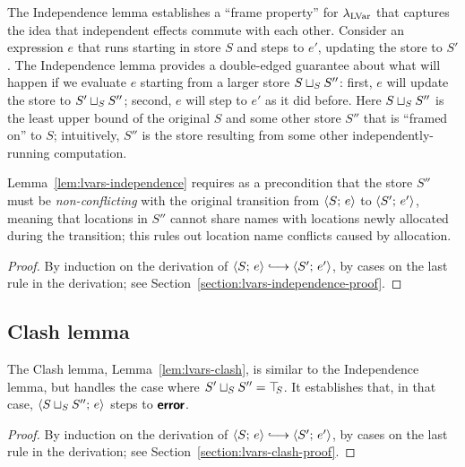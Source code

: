 
The Independence lemma establishes a ``frame property'' for
$\lambda_{\textrm{LVar}}$ that captures the idea that independent effects commute
with each other.  Consider an expression $e$ that runs starting in
store $S$ and steps to $e'$, updating the store to $S'$.  The
Independence lemma provides a double-edged guarantee about what will
happen if we evaluate $e$ starting from a larger store
$S \sqcup_{S} S''$: first, $e$ will update the store to
$S' \sqcup_{S} S''$; second, $e$ will step to $e'$ as it did before.
Here $S \sqcup_{S} S''$ is the least upper bound of the original $S$
and some other store $S''$ that is ``framed on'' to $S$; intuitively,
$S''$ is the store resulting from some other independently-running
computation.

Lemma~\ref{lem:lvars-independence} requires as a precondition that the
store $S''$ must be \emph{non-conflicting} with the original
transition from $\langle S;\, e \rangle$ to $\langle S';\, e' \rangle$, meaning that
locations in $S''$ cannot share names with locations newly allocated
during the transition; this rules out location name conflicts caused
by allocation.

\LVarsDefNonConflicting

\LVarsLemIndependence
\begin{proof}
  By induction on the derivation of $\config{S}{e} \parstepsto
  \config{S'}{e'}$, by cases on the last rule in the derivation; see
  Section~\ref{section:lvars-independence-proof}.
\end{proof}

\subsection{Clash lemma}

The Clash lemma, Lemma~\ref{lem:lvars-clash}, is similar to the
Independence lemma, but handles the case where $S' \sqcup_{S} S'' =
\top\hspace{-0.85mm}_{S}$.  It establishes that, in that case,
$\langle S \sqcup_{S} S'';\, e \rangle$ steps to $\textbf{\textsf{error}}$.


\LVarsLemClash
\begin{proof}
  By induction on the derivation of $\config{S}{e} \parstepsto
  \config{S'}{e'}$, by cases on the last rule in the derivation; see
  Section~\ref{section:lvars-clash-proof}.
\end{proof}

